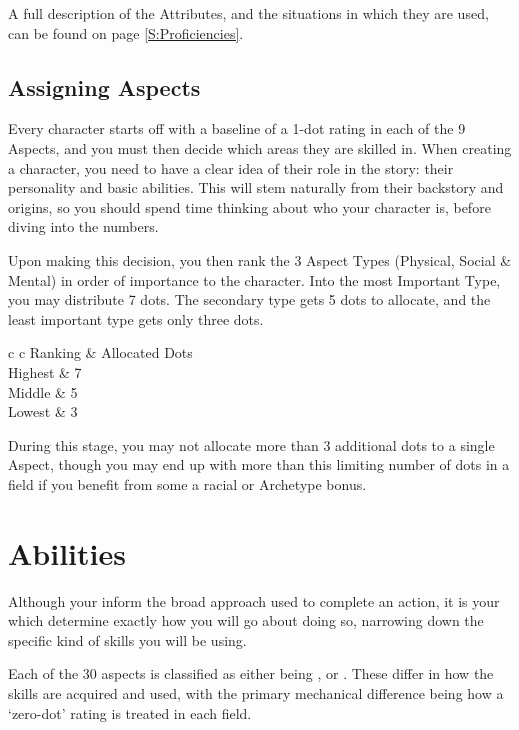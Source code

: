 A full description of the Attributes, and the situations in which they are used, can be found on page \ref{S:Proficiencies}.

\subsection{Assigning Aspects}

Every character starts off with a baseline of a 1-dot rating in each of the 9 Aspects, and you must then decide which areas they are skilled in. When creating a character, you need to have a clear idea of their role in the story: their personality and basic abilities. This will stem naturally from their backstory and origins, so you should spend time thinking about who your character is, before diving into the numbers. 

Upon making this decision, you then rank the 3 Aspect Types (Physical, Social \& Mental) in order of importance to the character. Into the most Important Type, you may distribute 7 dots. The secondary type gets 5 dots to allocate, and the least important type gets only three dots. 

\begin{center}
	\small
	\begin{rndtable}{c c}
	Ranking &  Allocated Dots \\
	Highest & 7
	\\
	Middle 	&	5
	\\
	Lowest & 3
	\end{rndtable}
\end{center}

During this stage, you may not allocate more than 3 additional dots to a single Aspect, though you may end up with more than this limiting number of dots in a field if you benefit from some a racial or Archetype bonus. 



\section{Abilities}

Although your  inform the broad approach used to complete an action, it is your  which determine exactly how you will go about doing so, narrowing down the specific kind of skills you will be using. 

Each of the 30 aspects is classified as either being ,  or . These differ in how the skills are acquired and used, with the primary mechanical difference being how a `zero-dot' rating is treated in each field. 

